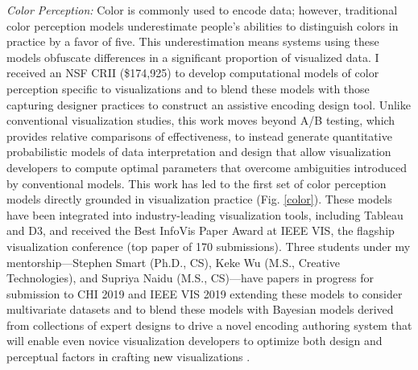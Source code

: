 \documentclass[11pt]{article}
\begin{document}
\emph{Color Perception: } Color is commonly used to encode data; however, traditional color perception models underestimate people's abilities to distinguish colors in practice by a favor of five. This underestimation means systems using these models obfuscate differences in a significant proportion of visualized data. %
I received an NSF CRII (\$174,925) to 
develop computational models of color perception specific to visualizations and to blend these models with those capturing designer practices to construct an assistive encoding design tool.
Unlike conventional visualization studies, this work moves beyond A/B testing, which provides relative comparisons of effectiveness, to instead generate quantitative probabilistic models of data interpretation and design that allow visualization developers to compute optimal parameters that overcome ambiguities introduced by conventional models. 
This work has led to the first set of color perception models directly grounded in visualization practice
\cite{szafir2018Modeling} (Fig. \ref{color}). %
These models have been integrated into industry-leading visualization tools, including Tableau and D3, and received the Best InfoVis Paper Award at IEEE VIS, the flagship visualization conference (top paper of 170 submissions). Three students under my mentorship---Stephen Smart (Ph.D., CS), Keke Wu (M.S., Creative Technologies), and Supriya Naidu (M.S., CS)---have papers in progress for submission to CHI 2019 and IEEE VIS 2019 extending these models to 
consider multivariate datasets \cite{naidu2019,smart2019CHI} and to blend these models with Bayesian models %
derived from collections of expert designs to drive a novel encoding authoring system that will enable even novice visualization developers to optimize both design and perceptual factors in crafting new visualizations \cite{smart2019VIS}.
\end{document}
